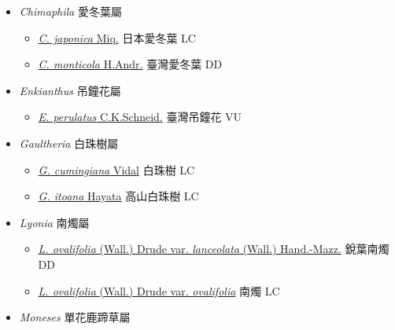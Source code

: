 
  \begin{itemize}
 \item[] \textit{Chimaphila} 愛冬葉屬
                    
  \begin{itemize}
        \item[] \href{http://www.theplantlist.org/tpl1.1/search?q=Chimaphila+japonica}{\textit{C. japonica} Miq.}   日本愛冬葉 LC
        \item[] \href{http://www.theplantlist.org/tpl1.1/search?q=Chimaphila+monticola}{\textit{C. monticola} H.Andr.}   臺灣愛冬葉 DD
  \end{itemize}
 \item[] \textit{Enkianthus} 吊鐘花屬
                    
  \begin{itemize}
        \item[] \href{http://www.theplantlist.org/tpl1.1/search?q=Enkianthus+perulatus}{\textit{E. perulatus} C.K.Schneid.}   臺灣吊鐘花 VU
  \end{itemize}
 \item[] \textit{Gaultheria} 白珠樹屬
                    
  \begin{itemize}
        \item[] \href{http://www.theplantlist.org/tpl1.1/search?q=Gaultheria+cumingiana}{\textit{G. cumingiana} Vidal}   白珠樹 LC
        \item[] \href{http://www.theplantlist.org/tpl1.1/search?q=Gaultheria+itoana}{\textit{G. itoana} Hayata}   高山白珠樹 LC
  \end{itemize}
 \item[] \textit{Lyonia} 南燭屬
                    
  \begin{itemize}
        \item[] \href{http://www.theplantlist.org/tpl1.1/search?q=Lyonia+ovalifolia+var.+lanceolata}{\textit{L. ovalifolia} (Wall.) Drude var. \textit{lanceolata} (Wall.) Hand.-Mazz.}   銳葉南燭 DD
        \item[] \href{http://www.theplantlist.org/tpl1.1/search?q=Lyonia+ovalifolia+var.+ovalifolia}{\textit{L. ovalifolia} (Wall.) Drude var. \textit{ovalifolia}}   南燭 LC
  \end{itemize}
 \item[] \textit{Moneses} 單花鹿蹄草屬
                    

\end{itemize}
